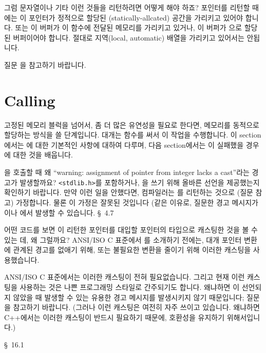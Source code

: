 \begin{faq}
	그럼 문자열이나 기타 이런 것들을 리턴하려면 어떻게 해야
	하죠?
\A
	포인터를 리턴할 때에는 이 포인터가 정적으로 할당된
	(statically-allcated) 공간을 가리키고 있어야 합니다.
	또는 이 버퍼가 이 함수에 전달된 메모리를 가리키고 있거나, 이 버퍼가
	으로 할당된 버퍼이어야 합니다.  절대로 지역(local,
	automatic) 배열을 가리키고 있어서는 안됩니다.
	
	질문 을 참고하기 바랍니다.
\end{faq}

\section{Calling }
고정된 메모리 블럭을 넘어서, 좀 더 많은 유연성을 필요로 한다면, 메모리를
동적으로 할당하는 방식을 쓸 단계입니다. 대개는  함수를 써서 이
작업을 수행합니다.
이 section에서는 에 대한 기본적인 사항에 대하여 다루며,
다음 section에서는 이 실패했을 경우에 대한 것을 배웁니다.

\begin{faq}
	을 호출할 때 왜 ``warning: assignment of pointer
	from integer lacks a cast''라는 경고가 발생할까요?
\A
	\verb+<stdlib.h>+를 포함하거나, 을 쓰기 위해 올바른
	선언을 제공했는지 확인하기 바랍니다. 만약 이런 일을 안했다면,
	컴파일러는 를 리턴하는 것으로 (질문  참고) 가정합니다.
	물론 이 가정은 잘못된 것입니다 (같은 이유로, 질문한 경고 메시지가
	이나 에서 발생할 수 있습니다.
\R
	\cite{hs} \S\ 4.7 
\end{faq}

\begin{faq}
	어떤 코드를 보면 이 리턴한 포인터를 대입할 포인터의
	타입으로 캐스팅한 것을 볼 수 있는 데, 왜 그럴까요?
\A
	ANSI/ISO C 표준에서 를 소개하기 전에는, 대개 포인터
	변환에 관계된 경고를 없애기 위해, 또는 불필요한 변환을 줄이기 위해
	이러한 캐스팅을 사용했습니다.

	ANSI/ISO C 표준에서는 이러한 캐스팅이 전혀 필요없습니다.
	그리고 현재 이런 캐스팅을 사용하는 것은 나쁜 프로그래밍 스타일로
	간주되기도 합니다.  왜냐하면 이 선언되지 않았을 때
	발생할 수 있는 유용한 경고 메시지를 발생시키지 않기 때문입니다;
	질문 을 참고하기 바랍니다.  (그러나 이런 캐스팅은 여전히
	자주 쓰이고 있습니다.  왜냐하면 C++에서는 이러한 캐스팅이 반드시
	필요하기 때문에, 호환성을 유지하기 위해서입니다.)

\R
	\cite{hs} \S\ 16.1 
\end{faq}

